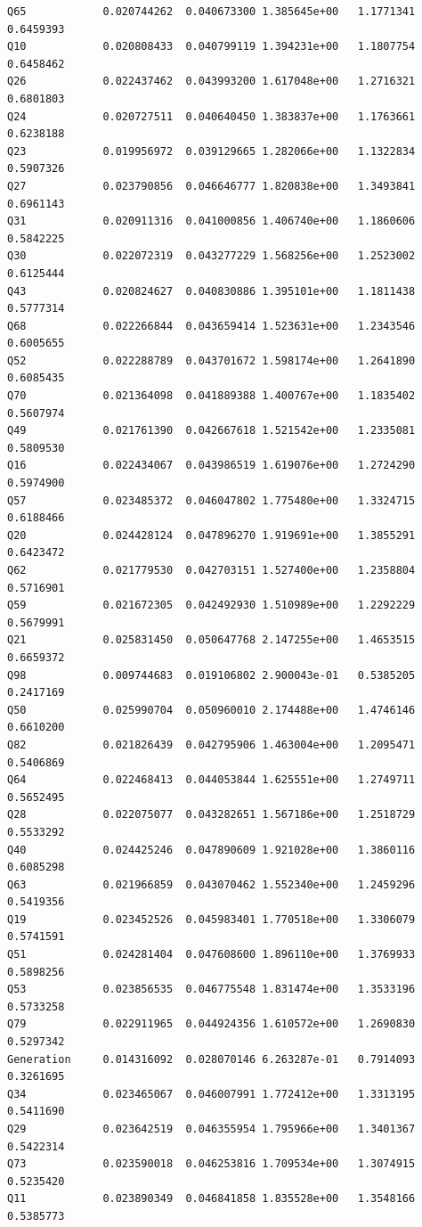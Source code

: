 \documentclass[
]{report}
\begin{document}
\begin{verbatim}
Q65            0.020744262  0.040673300 1.385645e+00   1.1771341 0.6459393
Q10            0.020808433  0.040799119 1.394231e+00   1.1807754 0.6458462
Q26            0.022437462  0.043993200 1.617048e+00   1.2716321 0.6801803
Q24            0.020727511  0.040640450 1.383837e+00   1.1763661 0.6238188
Q23            0.019956972  0.039129665 1.282066e+00   1.1322834 0.5907326
Q27            0.023790856  0.046646777 1.820838e+00   1.3493841 0.6961143
Q31            0.020911316  0.041000856 1.406740e+00   1.1860606 0.5842225
Q30            0.022072319  0.043277229 1.568256e+00   1.2523002 0.6125444
Q43            0.020824627  0.040830886 1.395101e+00   1.1811438 0.5777314
Q68            0.022266844  0.043659414 1.523631e+00   1.2343546 0.6005655
Q52            0.022288789  0.043701672 1.598174e+00   1.2641890 0.6085435
Q70            0.021364098  0.041889388 1.400767e+00   1.1835402 0.5607974
Q49            0.021761390  0.042667618 1.521542e+00   1.2335081 0.5809530
Q16            0.022434067  0.043986519 1.619076e+00   1.2724290 0.5974900
Q57            0.023485372  0.046047802 1.775480e+00   1.3324715 0.6188466
Q20            0.024428124  0.047896270 1.919691e+00   1.3855291 0.6423472
Q62            0.021779530  0.042703151 1.527400e+00   1.2358804 0.5716901
Q59            0.021672305  0.042492930 1.510989e+00   1.2292229 0.5679991
Q21            0.025831450  0.050647768 2.147255e+00   1.4653515 0.6659372
Q98            0.009744683  0.019106802 2.900043e-01   0.5385205 0.2417169
Q50            0.025990704  0.050960010 2.174488e+00   1.4746146 0.6610200
Q82            0.021826439  0.042795906 1.463004e+00   1.2095471 0.5406869
Q64            0.022468413  0.044053844 1.625551e+00   1.2749711 0.5652495
Q28            0.022075077  0.043282651 1.567186e+00   1.2518729 0.5533292
Q40            0.024425246  0.047890609 1.921028e+00   1.3860116 0.6085298
Q63            0.021966859  0.043070462 1.552340e+00   1.2459296 0.5419356
Q19            0.023452526  0.045983401 1.770518e+00   1.3306079 0.5741591
Q51            0.024281404  0.047608600 1.896110e+00   1.3769933 0.5898256
Q53            0.023856535  0.046775548 1.831474e+00   1.3533196 0.5733258
Q79            0.022911965  0.044924356 1.610572e+00   1.2690830 0.5297342
Generation     0.014316092  0.028070146 6.263287e-01   0.7914093 0.3261695
Q34            0.023465067  0.046007991 1.772412e+00   1.3313195 0.5411690
Q29            0.023642519  0.046355954 1.795966e+00   1.3401367 0.5422314
Q73            0.023590018  0.046253816 1.709534e+00   1.3074915 0.5235420
Q11            0.023890349  0.046841858 1.835528e+00   1.3548166 0.5385773

\end{verbatim}
\end{document}
